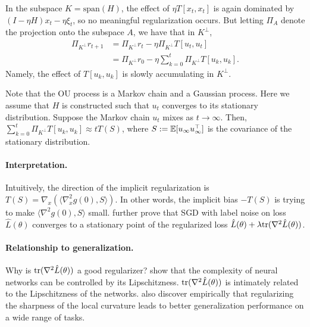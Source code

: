 In the subspace $K = \text{span}(H)$, the effect of $\eta T [x_t,x_t]$ is again dominated by $(I-\eta H)x_t - \eta \xi_t$, so no meaningful regularization occurs. But letting $\Pi_{A}$ denote the projection onto the subspace $A$, we have that in $K^\perp$,
\begin{align}
\Pi_{K^\perp}r_{t+1} &= \Pi_{K^\perp}r_t - \eta \Pi_{K^\perp} T[u_t,u_t]\\
&=\Pi_{K^\perp}r_0 - \eta \sum_{k=0}^{t}\Pi_{K^\perp}T[u_k,u_k].
\end{align}
Namely, the effect of $T[u_k,u_k]$ is slowly accumulating in ${K^\perp}$.

Note that the OU process is a Markov chain and a Gaussian process. Here we assume that $H$ is constructed such that $u_t$ converges to its stationary distribution. Suppose the Markov chain $u_t$ mixes as $t\rightarrow \infty$. Then, $\sum_{k=0}^{t}\Pi_{K^\perp}T[u_k,u_k] \approx tT(S)$, where $S:=\operatorname*{\mathbb{E}}[u_{\infty}u_{\infty}^\top]$ is the covariance of the stationary distribution.

\paragraph{Interpretation.} Intuitively, the direction of the implicit regularization is $T(S) = \nabla_x \left(\langle\nabla_x^2g(0), S\rangle\right)$. In other words, the implicit bias $-T(S)$ is trying to make $\langle\nabla^2g(0), S\rangle$ small. \cite{damian2021label} further prove that SGD with label noise on loss $\hat{L}(\theta)$ converges to a stationary point of the regularized loss $\hat{L}(\theta) + \lambda \textup{tr}(\nabla^2\hat{L}(\theta))$.

\paragraph{Relationship to generalization.} Why is $\textup{tr}(\nabla^2\hat{L}(\theta))$ a good regularizer? \cite{wei2019improved} show that the complexity of neural networks can be controlled by its Lipschitzness. $\textup{tr}(\nabla^2\hat{L}(\theta))$ is intimately related to the Lipschitzness of the networks. \cite{foret2020sharpness} also discover empirically that regularizing the sharpness of the local curvature leads to better generalization performance on a wide range of tasks.